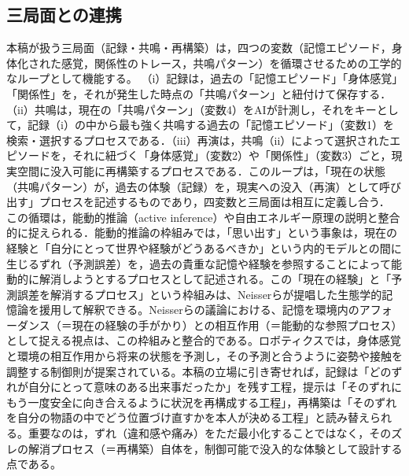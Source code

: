 \documentclass[originalpaper]{jsaiart}
\begin{document}
\subsection{三局面との連携}
本稿が扱う三局面（記録・共鳴・再構築）は，四つの変数（記憶エピソード，身体化された感覚，関係性のトレース，共鳴パターン）を循環させるための工学的なループとして機能する。
（i）記録は，過去の「記憶エピソード」「身体感覚」「関係性」を，それが発生した時点の「共鳴パターン」と紐付けて保存する． （ii）共鳴は，現在の「共鳴パターン」（変数4）をAIが計測し，それをキーとして，記録（i）の中から最も強く共鳴する過去の「記憶エピソード」（変数1）を検索・選択するプロセスである\cite{wada2007,kidd2008,sengers2005,mcadams2013}．（iii）再演は，共鳴（ii）によって選択されたエピソードを，それに紐づく「身体感覚」（変数2）や「関係性」（変数3）ごと，現実空間に没入可能に再構築するプロセスである．このループは，「現在の状態（共鳴パターン）が，過去の体験（記録）を，現実への没入（再演）として呼び出す」プロセスを記述するものであり，四変数と三局面は相互に定義し合う． この循環は，能動的推論（active inference）や自由エネルギー原理の説明と整合的に捉えられる\cite{friston2009,hesp2021,parr2022activeinference}．能動的推論の枠組みでは，「思い出す」という事象は，現在の経験と「自分にとって世界や経験がどうあるべきか」という内的モデルとの間に生じるずれ（予測誤差）を，過去の貴重な記憶や経験を参照することによって能動的に解消しようとするプロセスとして記述される\cite{friston2009,parr2022activeinference}。この「現在の経験」と「予測誤差を解消するプロセス」という枠組みは、Neisserらが提唱した生態学的記憶論\cite{Neisser1993Perceived}を援用して解釈できる。Neisserらの議論における、記憶を環境内のアフォーダンス（＝現在の経験の手がかり）との相互作用（＝能動的な参照プロセス）として捉える視点は、この枠組みと整合的である。ロボティクスでは，身体感覚と環境の相互作用から将来の状態を予測し，その予測と合うように姿勢や接触を調整する制御則が提案されている\cite{lanillos2021neuroscience,lanillos2020selfother,pabio2021}。本稿の立場に引き寄せれば，記録は「どのずれが自分にとって意味のある出来事だったか」を残す工程，提示は「そのずれにもう一度安全に向き合えるように状況を再構成する工程」，再構築は「そのずれを自分の物語の中でどう位置づけ直すかを本人が決める工程」と読み替えられる。重要なのは，ずれ（違和感や痛み）をただ最小化することではなく，そのズレの解消プロセス（＝再構築）自体を，制御可能で没入的な体験として設計する点である\cite{hesp2021}。
\end{document}
